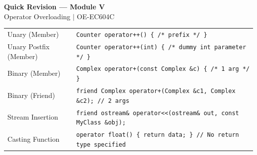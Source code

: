 \documentclass[12pt,a4paper]{article}
\renewcommand{\arraystretch}{1.45}
\begin{document}
\newpage
\begin{center}
  {\large\bfseries\color{myred} Quick Revision --- Module V}\\[3pt]
  {\small\color{mydark} Operator Overloading $|$ OE-EC604C}
\end{center}
\noindent{\color{myred}\rule{\linewidth}{1.2pt}}
\vspace{4pt}

\begin{tcolorbox}[formulabox, title={\textbf{Key Overloading Signatures}}]
\renewcommand{\arraystretch}{1.3}
\begin{tabularx}{\linewidth}{B{3.8cm} X}
Unary (Member)           & \texttt{Counter operator++() \{ /* prefix */ \}} \\[4pt]
Unary Postfix (Member)   & \texttt{Counter operator++(int) \{ /* dummy int parameter */ \}} \\[4pt]
Binary (Member)          & \texttt{Complex operator+(const Complex \&c) \{ /* 1 arg */ \}} \\[4pt]
Binary (Friend)          & \texttt{friend Complex operator+(Complex \&c1, Complex \&c2); // 2 args} \\[4pt]
Stream Insertion         & \texttt{friend ostream\& operator<<(ostream\& out, const MyClass \&obj);} \\[4pt]
Casting Function         & \texttt{operator float() \{ return data; \} // No return type specified}
\end{tabularx}
\end{tcolorbox}
\end{document}
